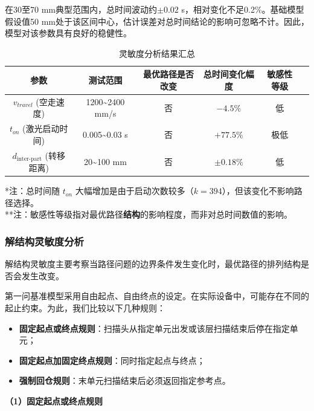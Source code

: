 \documentclass[a4paper, 12pt]{ctexart}
\begin{document}
在30至70 mm典型范围内，总时间波动约$\pm0.02$ s，相对变化不足0.2\%。基础模型假设值50 mm处于该区间中心，估计误差对总时间结论的影响可忽略不计。因此，模型对该参数具有良好的稳健性。

\begin{table}[H]
    \centering
    \caption{灵敏度分析结果汇总}
    \label{tab:sensitivity_summary}
    \begin{tabular}{cccccc}
        \toprule
        参数 & 测试范围 & 最优路径是否改变 & 总时间变化幅度 & 敏感性等级 \\
        \midrule
        $v_{travel}$ (空走速度) & 1200\textasciitilde2400 mm/s & 否 & $-4.5\%$ & 低 \\
        $t_{on}$ (激光启动时间) & 0.005\textasciitilde0.03 s & 否 & $+77.5\%$ & 极低 \\
        $d_{\text{inter-part}}$ (转移距离) & 20\textasciitilde100 mm & 否 & $\pm0.18\%$ & 低 \\
        \bottomrule
    \end{tabular}
    \begin{minipage}{\textwidth}
        \footnotesize
        *注：总时间随 $t_{on}$ 大幅增加是由于启动次数较多（$k=394$），但该变化不影响路径选择。\\
        **注：敏感性等级指对最优路径\textbf{结构}的影响程度，而非对总时间数值的影响。
    \end{minipage}
\end{table}


\subsubsection{解结构灵敏度分析}

解结构灵敏度主要考察当路径问题的边界条件发生变化时，最优路径的排列结构是否会发生改变。

第一问基准模型采用自由起点、自由终点的设定。在实际设备中，可能存在不同的起止约束。为此，我们比较以下几种规则：

\begin{itemize}
    \item \textbf{固定起点或终点规则}：扫描头从指定单元出发或该层扫描结束后停在指定单元；
    \item \textbf{固定起点加固定终点规则}：同时指定起点与终点；
    \item \textbf{强制回仓规则}：末单元扫描结束后必须返回指定参考点。
\end{itemize}


\noindent\textbf{（1）固定起点或终点规则}
\vspace{0.5em}
\end{document}
